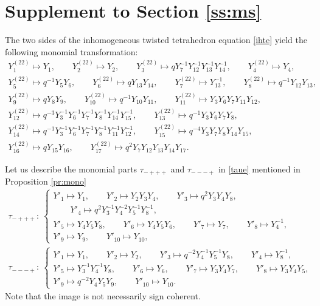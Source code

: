\appendix

\section[Supplement to Section 3.4]{Supplement to Section \ref{ss:ms}}\label{ap:sup}

The two sides of the inhomogeneous twisted tetrahedron equation \eqref{ihte} yield the
following monomial transformation:
\begin{gather}
Y^{(22)}_1 \mapsto Y_1, \qquad
Y^{(22)}_2 \mapsto Y_2, \qquad
Y^{(22)}_3 \mapsto qY^{-1}_{7}Y^{-1}_{12}Y^{-1}_{13}Y^{-1}_{14},\qquad
Y^{(22)}_4 \mapsto Y_4,\nonumber
\\
Y^{(22)}_5 \mapsto q^{-1}Y_5Y_6, \qquad
Y^{(22)}_6 \mapsto q Y_{13}Y_{14}, \qquad
Y^{(22)}_7 \mapsto Y^{-1}_{13},\qquad
Y^{(22)}_{8} \mapsto q^{-1}Y_{12}Y_{13},\nonumber\\
Y^{(22)}_{9} \mapsto qY_{8}Y_{9},
\qquad
Y^{(22)}_{10} \mapsto q^{-1}Y_{10}Y_{11}, \qquad
Y^{(22)}_{11} \mapsto Y_3Y_6Y_7Y_{11}Y_{12},\nonumber\\
Y^{(22)}_{12} \mapsto q^{-3}Y^{-1}_{3}Y^{-1}_{6}Y^{-1}_{7}Y^{-1}_{8}Y^{-1}_{14}Y^{-1}_{15},
\qquad
Y^{(22)}_ {13} \mapsto q^{-1}Y_3Y_6Y_7Y_8,\nonumber\\
Y^{(22)}_{14} \mapsto q^{-1}Y^{-1}_{3}Y^{-1}_{6}Y^{-1}_{7}Y^{-1}_{8}Y^{-1}_{11}Y^{-1}_{12},\qquad
Y^{(22)}_ {15} \mapsto q^{-4}Y_3Y_7Y_8Y_{14}Y_{15},\nonumber\\
Y^{(22)}_{16} \mapsto qY_{15}Y_{16},\qquad
Y^{(22)}_{17} \mapsto q^{2}Y_7Y_{12}Y_{13}Y_{14}Y_{17}.\label{y22}
\end{gather}

Let us describe the monomial parts $\tau_{-+++}$ and $\tau_{---+}$ in \eqref{taue} mentioned
in Proposition \ref{pr:mono}
\begin{gather*}
\tau_{-+++}\colon\
\begin{cases}
Y'_1 \mapsto Y_1,\qquad
Y'_2 \mapsto Y_2Y_3Y_4, \qquad
Y'_3 \mapsto q^2Y_3Y_4Y_8, \\ \qquad
Y'_4 \mapsto q^2Y^{-1}_3Y^{-2}_4Y^{-1}_5Y^{-1}_8,
\\
Y'_5 \mapsto Y_4Y_5Y_8, \qquad
Y'_6 \mapsto Y_4 Y_5 Y_6,\qquad
Y'_7 \mapsto Y_7,\qquad
Y'_8 \mapsto Y^{-1}_4,
\\
Y'_9 \mapsto Y_9, \qquad
Y'_{10} \mapsto Y_{10},
\end{cases}
\\
 \tau_{---+}\colon\
\begin{cases}
Y'_1 \mapsto Y_1,\qquad
Y'_2 \mapsto Y_2, \qquad
Y'_3 \mapsto q^{-2}Y^{-1}_4Y^{-1}_5Y_8, \qquad
Y'_4 \mapsto Y^{-1}_8, \qquad
\\
Y'_5 \mapsto Y^{-1}_3Y^{-1}_4Y_8, \qquad
Y'_6 \mapsto Y_6,\qquad
Y'_7 \mapsto Y_3Y_4Y_7,\qquad
Y'_8 \mapsto Y_3Y_4Y_5,
\\
Y'_9 \mapsto q^{-2} Y_4Y_5Y_9, \qquad
Y'_{10} \mapsto Y_{10}.
\end{cases}
\end{gather*}
Note that the image is not necessarily sign coherent.
